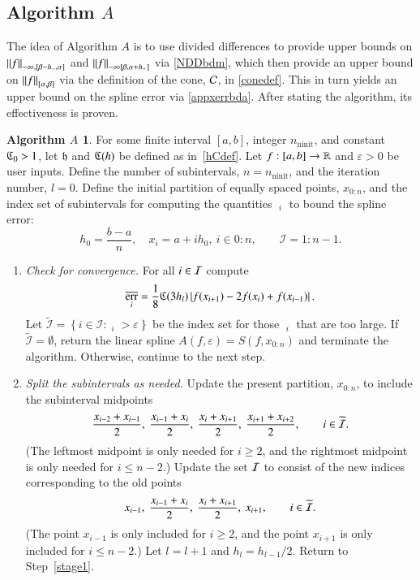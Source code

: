 \documentclass[review]{elsarticle}
\newcommand{\abstol}{\varepsilon}
\newcommand{\zton}{0\!:\!n}
\theoremstyle{definition}
\newtheorem*{algoA}{Algorithm $A$}
\DeclareMathOperator{\ninit}{ninit}
\DeclareMathOperator{\oerr}{\overline{err}}
\begin{document}
\subsection{Algorithm $A$} \label{subsec:appxalgo}

The idea of Algorithm $A$ is to use divided differences to provide upper bounds
on $\norm[-\infty,{[\beta - h_-, \alpha]}]{f}$ and $\norm[-\infty{[\beta,
\alpha+h_+]}]{f}$ via \eqref{NDDbdm}, which then provide an upper bound on
$\norm[{[\alpha,\beta]}]{f}$ via the definition of the cone, $\cc$, in
\eqref{conedef}. This in turn yields an upper bound on the spline error via
\eqref{appxerrbda}. After stating the algorithm, its effectiveness is proven.

\begin{algoA} \label{AlgoA}
For some finite interval $[a,b]$, integer $n_{\ninit}$, and constant $\fC_0 >
1$, let $\fh$ and $\fC(h)$ be defined as in~\eqref{hCdef}. Let $f:[a,b] \to
\reals$ and $\abstol >0$ be user inputs. Define the number of subintervals,
$n=n_{\ninit}$, and the iteration number, $l = 0$. Define the initial partition
of equally spaced points, $x_{0:n}$, and the index set of subintervals for
computing the quantities $\oerr_i$ to bound the spline error:
\[
h_0 =\frac{b-a}{n}, \quad  x_i=a+ ih_0, \ i \in \zton, \qquad \mathcal{I} = 1\!:\!n-1.
\]

\begin{enumerate}[\em Step 1.]

\item \label{stage1} \emph{Check for convergence.} For all $i \in \ci$ compute
\begin{equation} \label{oerrdef}
\oerr_i = \frac{1}{8} \fC(3h_l)\abs{f(x_{i+1}) - 2f(x_i) + f(x_{i-1})}.
\end{equation}
Let $\widetilde{\mathcal{I}} = \left\{i \in \mathcal{I}: \oerr_i  > \abstol \right\}$
be the index set for those $\oerr_i $ that are too large.   If $\widetilde{\mathcal{I}} =
\emptyset$, return the linear spline $A(f,\abstol) = S(f, x_{0:n})$ and terminate
the algorithm. Otherwise, continue to the next step.

\item \label{stage2} \emph{Split the subintervals as needed.}
Update the present partition, $x_{0:n}$, to include the subinterval midpoints
\[
  \frac{x_{i-2} +x_{i-1}}{2}, \ \frac{x_{i-1} +x_{i}}{2},
\ \frac{x_{i} +x_{i+1}}{2}, \  \frac{x_{i+1} +x_{i+2}}{2}, \qquad i \in \widetilde{\ci}.
\]
(The leftmost midpoint is only needed for $i \ge 2$, and the rightmost midpoint
is only needed for $i \le n-2$.) Update the set $\ci$ to consist of the new
indices corresponding to the old points
\[
x_{i-1}, \ \frac{x_{i-1} +x_{i}}{2}, \ \frac{x_{i} +x_{i+1}}{2}, \  x_{i+1},
\qquad i \in \widetilde{\ci}.
\]
(The point $x_{i-1}$ is only included for $ i \ge 2$, and the point $x_{i+1}$ is
only included for $i \le n-2$.) Let $l = l+1$ and $h_l = h_{l-1}/2$.  Return to
Step~\ref{stage1}.
\end{enumerate}
\end{algoA}
\end{document}
